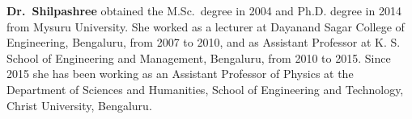 \bigskip

\noindent
\textbf{Dr.\ Shilpashree} obtained the M.Sc.\ degree in 2004 and Ph.D. degree in 2014 from Mysuru University. She worked as a lecturer at Dayanand Sagar College of Engineering, Bengaluru, from 2007 to 2010, and as Assistant Professor at K. S. School of Engineering and Management, Bengaluru, from 2010 to 2015. Since 2015 she has been working as an Assistant Professor of Physics at the Department of Sciences and Humanities, School of Engineering and Technology, Christ University, Bengaluru.
